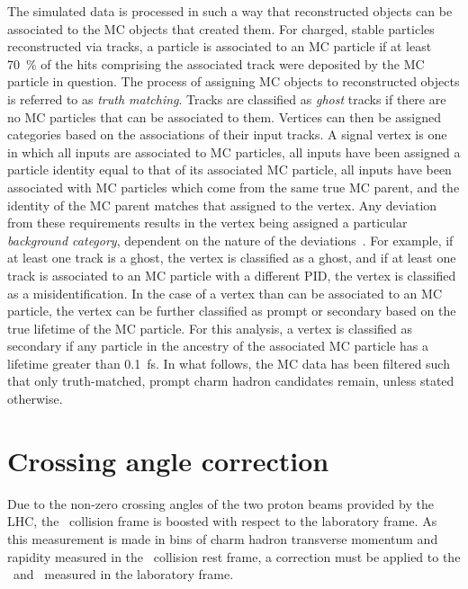 The simulated data is processed in such a way that reconstructed objects can be 
associated to the \ac{MC} objects that created them.
For charged, stable particles reconstructed via tracks, a particle is 
associated to an \ac{MC} particle if at least \SI{70}{\percent} of the hits 
comprising the associated track were deposited by the \ac{MC} particle in 
question.
The process of assigning \ac{MC} objects to reconstructed objects is referred 
to as \emph{truth matching}.
Tracks are classified as \emph{ghost} tracks if there are no \ac{MC} particles 
that can be associated to them.
Vertices can then be assigned categories based on the associations of their 
input tracks.
A signal vertex is one in which all inputs are associated to \ac{MC} particles, all inputs have been assigned a particle identity equal to that of its associated \ac{MC} particle, all inputs have been associated with \ac{MC} particles which come from the same true \ac{MC} parent, and the identity of the \ac{MC} parent matches that assigned to the vertex.
Any deviation from these requirements results in the vertex being assigned a particular \emph{background category}, dependent on the nature of the deviations~\cite{Gligorov:1035682}.
For example, if at least one track is a ghost, the vertex is classified as a ghost, and if at least one track is associated to an \ac{MC} particle with a different \ac{PID}, the vertex is classified as a misidentification.
In the case of a vertex than can be associated to an \ac{MC} particle, the 
vertex can be further classified as prompt or secondary based on the true 
lifetime of the \ac{MC} particle.
For this analysis, a vertex is classified as secondary if any particle in the 
ancestry of the associated \ac{MC} particle has a lifetime greater than 
\SI{0.1}{\femto\second}.\footnotemark
In what follows, the \ac{MC} data has been filtered such that only 
truth-matched, prompt charm hadron candidates remain, unless stated otherwise.


\section{Crossing angle correction}
\label{chap:prod:data:crossing_angle}

Due to the non-zero crossing angles of the two proton beams provided by the 
\ac{LHC}, the \pp\ collision frame is boosted with respect to the laboratory 
frame.
As this measurement is made in bins of charm hadron transverse momentum and 
rapidity measured in the \pp\ collision rest frame, a correction must be 
applied to the \pT\ and \rapidity\ measured in the laboratory frame.

